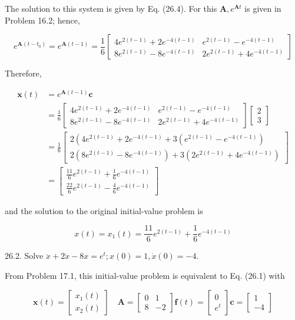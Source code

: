 \documentclass[10pt]{article}
\begin{document}
The solution to this system is given by Eq. (26.4). For this $\mathbf{A}, e^{\mathbf{A} t}$ is given in Problem 16.2; hence,

$$
e^{\mathbf{A}\left(t-t_{0}\right)}=e^{\mathbf{A}(t-1)}=\frac{1}{6}\left[\begin{array}{cc}
4 e^{2(t-1)}+2 e^{-4(t-1)} & e^{2(t-1)}-e^{-4(t-1)} \\
8 e^{2(t-1)}-8 e^{-4(t-1)} & 2 e^{2(t-1)}+4 e^{-4(t-1)}
\end{array}\right]
$$

Therefore,

$$
\begin{aligned}
\mathbf{x}(t) & =e^{\mathbf{A}(t-1)} \mathbf{c} \\
& =\frac{1}{6}\left[\begin{array}{cc}
4 e^{2(t-1)}+2 e^{-4(t-1)} & e^{2(t-1)}-e^{-4(t-1)} \\
8 e^{2(t-1)}-8 e^{-4(t-1)} & 2 e^{2(t-1)}+4 e^{-4(t-1)}
\end{array}\right]\left[\begin{array}{l}
2 \\
3
\end{array}\right] \\
& =\frac{1}{6}\left[\begin{array}{l}
2\left(4 e^{2(t-1)}+2 e^{-4(t-1)}+3\left(e^{2(t-1)}-e^{-4(t-1)}\right)\right. \\
2\left(8 e^{2(t-1)}-8 e^{-4(t-1)}\right)+3\left(2 e^{2(t-1)}+4 e^{-4(t-1)}\right)
\end{array}\right] \\
& =\left[\begin{array}{l}
\frac{11}{6} e^{2(t-1)}+\frac{1}{6} e^{-4(t-1)} \\
\frac{22}{6} e^{2(t-1)}-\frac{4}{6} e^{-4(t-1)}
\end{array}\right]
\end{aligned}
$$

and the solution to the original initial-value problem is

$$
x(t)=x_{1}(t)=\frac{11}{6} e^{2(t-1)}+\frac{1}{6} e^{-4(t-1)}
$$

26.2. Solve $\ddot{x}+2 \dot{x}-8 x=e^{t} ; x(0)=1, \dot{x}(0)=-4$.

From Problem 17.1, this initial-value problem is equivalent to Eq. (26.1) with

$$
\mathbf{x}(t)=\left[\begin{array}{l}
x_{1}(t) \\
x_{2}(t)
\end{array}\right] \quad \mathbf{A}=\left[\begin{array}{rr}
0 & 1 \\
8 & -2
\end{array}\right] \mathbf{f}(t)=\left[\begin{array}{l}
0 \\
e^{t}
\end{array}\right] \mathbf{c}=\left[\begin{array}{r}
1 \\
-4
\end{array}\right]
$$
\end{document}
